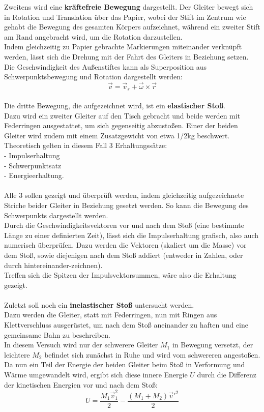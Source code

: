 \documentclass[12pt,a4paper]{article}
\begin{document}
\begin{multicols}{2}
Zweitens wird eine \textbf{kräftefreie Bewegung} dargestellt. Der Gleiter bewegt sich in Rotation und Translation über das Papier, wobei der Stift im Zentrum wie gehabt die Bewegung des gesamten Körpers aufzeichnet, während ein zweiter Stift am Rand angebracht wird, um die Rotation darzustellen.\\
Indem gleichzeitig zu Papier gebrachte Markierungen miteinander verknüpft werden, lässt sich die Drehung mit der Fahrt des Gleiters in Beziehung setzen.\\
Die Geschwindigkeit des Außenstiftes kann als Superposition aus Schwerpunktsbewegung und Rotation dargestellt werden:
$$\vec v = \vec v_s + \vec \omega \times \vec r$$
\\
Die dritte Bewegung, die aufgezeichnet wird, ist ein \textbf{elastischer Stoß}.\\
Dazu wird ein zweiter Gleiter auf den Tisch gebracht und beide werden mit Federringen ausgestattet, um sich gegenseitig abzustoßen. Einer der beiden Gleiter wird zudem mit einem Zusatzgewicht von etwa 1/2kg beschwert.\\
Theoretisch gelten in diesem Fall 3 Erhaltungssätze:\\
- Impulserhaltung\\
- Schwerpunktsatz\\
- Energieerhaltung.\\
\\
Alle 3 sollen gezeigt und überprüft werden, indem gleichzeitig aufgezeichnete Striche beider Gleiter in Beziehung gesetzt werden. So kann die Bewegung des Schwerpunkts dargestellt werden.\\
Durch die Geschwindigkeitsvektoren vor und nach dem Stoß (eine bestimmte Länge zu einer definierten Zeit), lässt sich die Impulserhaltung grafisch, also auch numerisch überprüfen. Dazu werden die Vektoren (skaliert um die Masse) vor dem Stoß, sowie diejenigen nach dem Stoß addiert (entweder in Zahlen, oder durch hintereinander-zeichnen).\\
Treffen sich die Spitzen der Impulsvektorsummen, wäre also die Erhaltung gezeigt.\\
\\
Zuletzt soll noch ein \textbf{inelastischer Stoß} untersucht werden.\\
Dazu werden die Gleiter, statt mit Federringen, nun mit Ringen aus Klettverschluss ausgerüstet, um nach dem Stoß aneinander zu haften und eine gemeinsame Bahn zu beschreiben.\\
In diesem Versuch wird nur der schwerere Gleiter $M_1$ in Bewegung versetzt, der leichtere $M_2$ befindet sich zunächst in Ruhe und wird vom schwereren angestoßen.\\
Da nun ein Teil der Energie der beiden Gleiter beim Stoß in Verformung und Wärme umgewandelt wird, ergibt sich diese innere Energie $U$ durch die Differenz der kinetischen Energien vor und nach dem Stoß:
$$U=\frac{M_1 \vec v_1^2}{2}-\frac{(M_1+M_2) \vec v'^2}{2}$$




\end{multicols}
\end{document}
